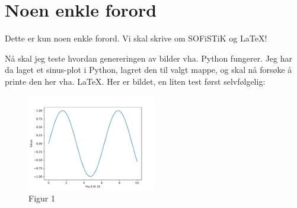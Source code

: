 \section{Noen enkle forord} \label{sec: forord}

Dette er kun noen enkle forord. 
Vi skal skrive om SOFiSTiK og \LaTeX!

Nå skal jeg teste hvordan genereringen av bilder vha. Python fungerer. Jeg har da laget et sinus-plot i Python,
lagret den til valgt mappe, og skal nå forsøke å printe den her vha. \LaTeX. Her er bildet, en liten test først selvfølgelig:

\begin{figure}[h]
    \centering
    \includegraphics[width=0.5\textwidth]{0 FIGURER/sinus}
    \caption{Figur 1}
    \label{fig:figure}
\end{figure}